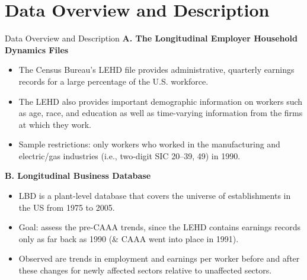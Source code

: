 \documentclass{beamer}
\begin{document}
\section{Data Overview and Description}
\begin{frame}[shrink]
	\transfade %
	\tableofcontents[sectionstyle=show/shaded,subsectionstyle=show/shaded/hide]
	\addtocounter{framenumber}{-1}
\end{frame}
\begin{frame}{Data Overview and Description}
	\textbf{A. The Longitudinal Employer Household Dynamics Files}
	\begin{itemize}
		\item The Census Bureau’s LEHD file provides administrative, quarterly earnings records for a large percentage of the U.S. workforce.
		\item The LEHD also provides important demographic information on workers such as age, race, and education as well as time-varying information from the firms at which they work.
		\item Sample restrictions: only workers who worked in the manufacturing and electric/gas industries (i.e., two-digit SIC 20–39, 49) in 1990.
	\end{itemize}
	\textbf{B. Longitudinal Business Database}
	\begin{itemize}
		\item LBD is a plant-level database that covers the universe of establishments in the US from 1975 to 2005.
		\item Goal: assess the pre-CAAA trends, since the LEHD contains earnings records only as far back as 1990 (\& CAAA went into place in 1991).
		\item Observed are trends in employment and earnings per worker before and after these changes for newly affected sectors relative to unaffected sectors.
	\end{itemize}
\end{frame}
\end{document}
